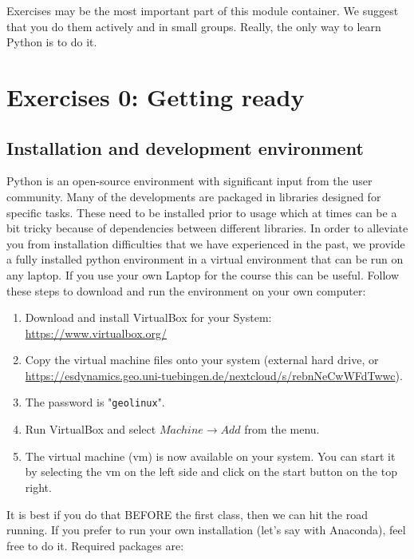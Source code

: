 \begin{tcolorbox}[enhanced jigsaw,breakable,pad at break*=1mm,
    colback=blue!5!white,colframe=babyblueeyes,title=Exercises]
    Exercises may be the most important part of this module container.
    We suggest that you do them actively and in small groups. Really, the only way to learn Python is to do it.      
\end{tcolorbox}
\section{Exercises 0: Getting ready}

\subsection{Installation and development environment}
Python is an open-source environment with significant input from the user community.
Many of the developments are packaged in libraries designed for specific tasks.
These need to be installed prior to usage which at times can be a bit tricky because of dependencies between
different libraries. In order to alleviate you from installation difficulties that we have experienced in
the past, we provide a fully installed python environment in a virtual environment that can be run on any laptop.
If you use your own Laptop for the course this can be useful. Follow these steps to download and run the environment on your own computer:\\

\begin{enumerate}
    \item Download and install VirtualBox for your System: \url{https://www.virtualbox.org/}
    \item Copy the virtual machine files onto your system (external hard drive, or \url{https://esdynamics.geo.uni-tuebingen.de/nextcloud/s/rebnNeCwWFdTwwc}).
    \item The password is "\verb|geolinux|".
    \item Run VirtualBox and select $Machine \rightarrow Add$ from the menu.
    \item The virtual machine (vm) is now available on your system. You can start it by selecting the vm on the left side and click on the start button on the top right.
\end{enumerate}

It is best if you do that BEFORE the first class, then we can hit the road running. If you prefer to run your own installation (let's say with Anaconda),
feel free to do it. Required packages are:

